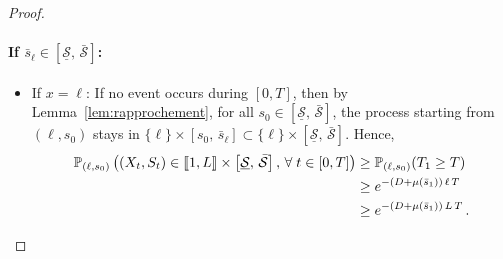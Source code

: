 \documentclass[10pt]{amsart}
\theoremstyle{definition}\newtheorem{defi}[theo]{Definition}\newtheorem{rema}[theo]{Remark}\newtheorem{exam}[theo]{Example}\newtheorem{exem}[theo]{Example}\newtheorem{nota}[theo]{Notation}
\newcommand{\llbracket}{\mathopen{[\mkern -2.7mu[}}
\newcommand{\rrbracket}{\mathclose{]\mkern -2.7mu]}}
\newcommand{\PP}{\mathbb{P}}
\newcommand{\Smin}{\underline{\mathcal{S}}}
\newcommand{\Smax}{\bar{\mathcal{S}}}
\newcommand{\barmu}{\mu(\bar s_1)}
\newcommand{\setunL}{\llbracket 1, L\rrbracket}
\newcommand{\1}{\mathbf{1}}
\let\oldforall\forall
\renewcommand*{\forall}{\mathrel{\oldforall}}
\begin{document}
\begin{proof}
\paragraph{If $\bar s_\ell \in [\Smin, \, \Smax]$:}
\begin{itemize}
\item If $x=\ell$: If no event occurs during $[0,T]$, then by Lemma~\ref{lem:rapprochement}, for all $s_0 \in [\Smin, \, \Smax]$, the process starting from $(\ell, s_0)$ stays in $\{\ell\}\times [s_0, \, \bar s_\ell]\subset \{\ell\}\times [\Smin, \, \Smax]$. Hence,
\begin{equation}\label{eq.stayinS.noevent}
\begin{split}
\PP_{(\ell,s_0)}
\left(\left(X_t,S_t\right) \in \setunL\times \left[\Smin, \, \Smax\right], \,
\forall t\in[0,T]\right) &\geq \PP_{(\ell,s_0)}(T_1 \geq T)
\\
&\geq e^{-(D+\barmu)\,\ell\,T}
\\
&\geq e^{-(D+\barmu)\,L\,T}\,.
\end{split}
\end{equation}


\end{itemize}
\end{proof}
\end{document}

